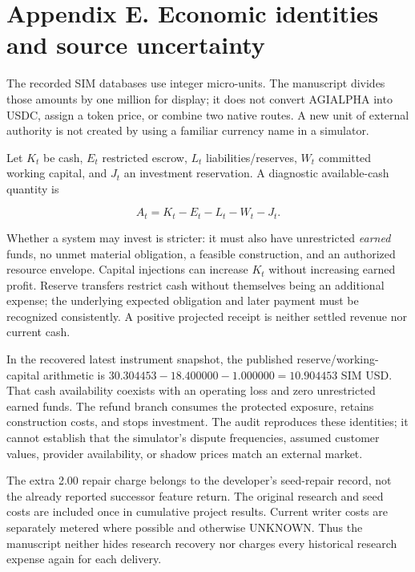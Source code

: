 \section*{Appendix E. Economic identities and source
uncertainty}\label{appendix-accounting}

The recorded SIM databases use integer micro-units. The manuscript
divides those amounts by one million for display; it does not convert
AGIALPHA into USDC, assign a token price, or combine two native routes.
A new unit of external authority is not created by using a familiar
currency name in a simulator.

Let \(K_t\) be cash, \(E_t\) restricted escrow, \(L_t\)
liabilities/reserves, \(W_t\) committed working capital, and \(J_t\) an
investment reservation. A diagnostic available-cash quantity is

\[
A_t=K_t-E_t-L_t-W_t-J_t.
\]

Whether a system may invest is stricter: it must also have unrestricted
\emph{earned} funds, no unmet material obligation, a feasible
construction, and an authorized resource envelope. Capital injections
can increase \(K_t\) without increasing earned profit. Reserve transfers
restrict cash without themselves being an additional expense; the
underlying expected obligation and later payment must be recognized
consistently. A positive projected receipt is neither settled revenue
nor current cash.

In the recovered latest instrument snapshot, the published
reserve/working-capital arithmetic is
\(30.304453-18.400000-1.000000=10.904453\) SIM USD. That cash
availability coexists with an operating loss and zero unrestricted
earned funds. The refund branch consumes the protected exposure, retains
construction costs, and stops investment. The audit reproduces these
identities; it cannot establish that the simulator's dispute
frequencies, assumed customer values, provider availability, or shadow
prices match an external market.

The extra 2.00 repair charge belongs to the developer's seed-repair
record, not the already reported successor feature return. The original
research and seed costs are included once in cumulative project results.
Current writer costs are separately metered where possible and otherwise
UNKNOWN. Thus the manuscript neither hides research recovery nor charges
every historical research expense again for each delivery.

